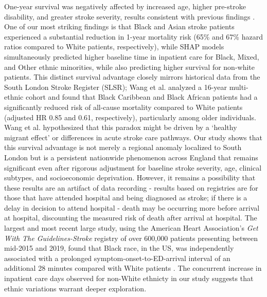 One-year survival was negatively affected by increased age, higher pre-stroke disability, and greater stroke severity, results consistent with previous findings \cite{nambiar2022}. One of our most striking findings is that Black and Asian stroke patients experienced a substantial reduction in 1-year mortality risk (65\% and 67\% hazard ratios compared to White patients, respectively), while SHAP models simultaneously predicted higher baseline time in inpatient care for Black, Mixed, and Other ethnic minorities, while also predicting higher survival for non-white patients. This distinct survival advantage closely mirrors historical data from the South London Stroke Register (SLSR); Wang et al. \cite{wang2013trends} analyzed a 16-year multi-ethnic cohort and found that Black Caribbean and Black African patients had a significantly reduced risk of all-cause mortality compared to White patients (adjusted HR 0.85 and 0.61, respectively), particularly among older individuals. Wang et al. hypothesized that this paradox might be driven by a `healthy migrant effect' or differences in acute stroke care pathways. Our study shows that this survival advantage is not merely a regional anomaly localized to South London but is a persistent nationwide phenomenon across England that remains significant even after rigorous adjustment for baseline stroke severity, age, clinical subtypes, and socioeconomic deprivation. However, it remains a possibility that these results are an artifact of data recording - results based on registries are for those that have attended hospital and being diagnosed as stroke; if there is a delay in decision to attend hospital - death may be occurring more before arrival at hospital, discounting the measured risk of death after arrival at hospital. The largest and most recent large study, using the American Heart Association's \textit{Get With The Guidelines-Stroke} registry of over 600,000 patients presenting between mid-2015 and 2019, found that Black race, in the US, was independently associated with a prolonged symptom-onset-to-ED-arrival interval of an additional 28 minutes compared with White patients \cite{royan2024disparities}. The concurrent increase in inpatient care days observed for non-White ethnicty in our study suggests that ethnic variations warrant deeper exploration. 


